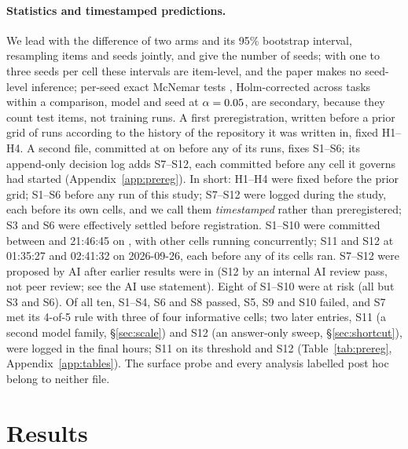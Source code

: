 \documentclass{article}
\theoremstyle{definition}
\begin{document}
\paragraph{Statistics and timestamped predictions.}
\label{sec:prereg}
We lead with the difference of two arms and its 95\% bootstrap interval, resampling items and seeds jointly, and give the number of seeds; with one to three seeds per cell these intervals are item-level, and the paper makes no seed-level inference; per-seed exact McNemar tests \citep{mcnemar1947note}, Holm-corrected \citep{holm1979simple} across tasks within a comparison, model and seed at $\alpha=0.05$, are secondary, because they count test items, not training runs. A first preregistration, written before a prior grid of \nPriorRuns{} runs according to the history of the repository it was written in, fixed H1--H4. A second file, committed at \preregTime{} on \preregDate{} before any of its runs, fixes S1--S6; its append-only decision log adds S7--S12, each committed before any cell it governs had started (Appendix~\ref{app:prereg}). In short: H1--H4 were fixed before the prior grid; S1--S6 before any run of this study; S7--S12 were logged during the study, each before its own cells, and we call them \emph{timestamped} rather than preregistered; S3 and S6 were effectively settled before registration. S1--S10 were committed between \preregTime{} and 21:46:45 on \preregDate{}, with other cells running concurrently; S11 and S12 at 01:35:27 and 02:41:32 on 2026-09-26, each before any of its cells ran. S7--S12 were proposed by AI after earlier results were in (S12 by an internal AI review pass, not peer review; see the AI use statement). Eight of S1--S10 were at risk (all but S3 and S6). Of all ten, S1--S4, S6 and S8 passed, S5, S9 and S10 failed, and S7 met its 4-of-5 rule with three of four informative cells; two later entries, S11 (a second model family, \S\ref{sec:scale}) and S12 (an answer-only sweep, \S\ref{sec:shortcut}), were logged in the final hours; S11 \SElevenVerdict{} on its threshold and S12 \STwelveVerdict{} (Table~\ref{tab:prereg}, Appendix~\ref{app:tables}). The surface probe and every analysis labelled post hoc belong to neither file.

\section{Results}
\label{sec:results}
\end{document}
